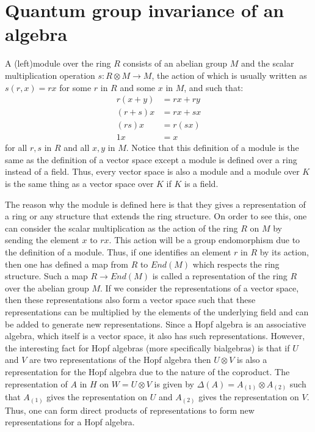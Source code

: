 \section{Quantum group invariance of an algebra}
A (left)module over the ring $R$ consists of an abelian group $M$ and the scalar
multiplication operation $s: R \otimes M \rightarrow M$, the action of which is
usually written as $s(r, x) = rx$ for some $r$ in $R$ and some $x$ in $M$, and such that:
\begin{align}
r(x+y) &= rx+ry \\
(r+s)x &= rx+sx \\
(rs)x &= r(sx) \\
1x &= x
\end{align}
for all $r,s$ in $R$ and all $x, y$ in $M$. Notice that this definition of a module is the same
as the definition of a vector space except a module is defined over a ring instead of a field.
Thus, every vector space is also a module and a module over $K$ is the same thing as a vector
space over $K$ if $K$ is a field.

The reason why the module is defined here is that they gives a representation of a ring or any
structure that extends the ring structure. On order to see this, one can consider the scalar
multiplication as the action of the ring $R$ on $M$ by sending the element $x$ to $rx$. This action
will be a group endomorphism due to the definition of a module. Thus, if one identifies an element
$r$ in $R$ by its action, then one has defined a map from $R$ to $End(M)$ which respects the
ring structure. Such a map $R \rightarrow End(M)$ is called a representation of the ring $R$ over
the abelian group $M$. If we consider the representations of a vector space, then these representations
also form a vector space such that these representations can be multiplied by the elements
of the underlying field and can be added to generate new representations. Since a Hopf algebra
is an associative algebra, which itself is a vector space, it also has such
representations. However, the interesting fact for Hopf algebras (more specifically bialgebras)
is that if $U$ and $V$ are two representations of the Hopf algebra then $U \otimes V$ is also
a representation for the Hopf algebra due to the nature of the coproduct. The representation
of $A$ in $H$ on $W = U \otimes V$ is given by $\Delta(A) = A_{(1)} \otimes A_{(2)}$ such that
$A_{(1)}$ gives the representation on $U$ and $A_{(2)}$ gives the representation on $V$.
Thus, one can form direct products of representations to form new representations for a Hopf
algebra.

